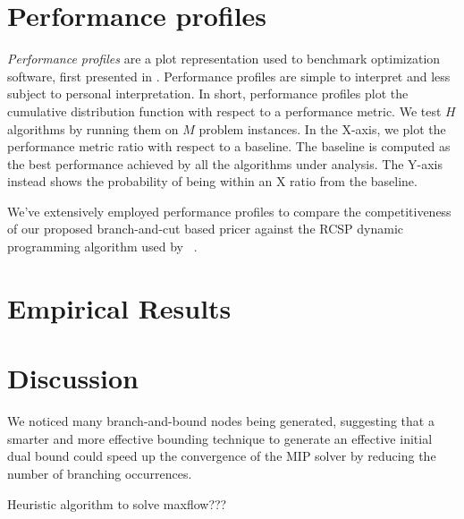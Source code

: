 \section{Performance profiles}
\label{sec:results-performance-profiles}

\textit{Performance profiles} are a plot representation used to benchmark optimization software,
first presented in \textcite{dolan2002}.
Performance profiles are simple to interpret and less subject to personal interpretation.
In short, performance profiles plot the cumulative distribution function with respect to a performance metric.
We test $H$ algorithms by running them on $M$ problem instances.
In the X-axis, we plot the performance metric ratio with respect to a baseline.
The baseline is computed as the best performance achieved by all the algorithms under analysis.
The Y-axis instead shows the probability of being within an X ratio from the baseline.

\medskip

We've extensively employed performance profiles to compare the competitiveness of
our proposed branch-and-cut based pricer
against the RCSP dynamic programming algorithm used by \bapcod\ \parencite{pessoa2020a}.

\begin{comment}
In this thesis, we will use performance profiles extensively to measure each solver by exploiting two performance metrics: \textbf{Time metric}, \textbf{Cost metric}.

A \textbf{Time performance profile} will tell us which resolution method is the fastest in terms of runtime.
A \textbf{Cost performance profile}, instead, will show us the cost ratio of the best upper bound obtained from each resolution method.
The ground truth optimal, as extracted from the dataset, is used instead as the cost baseline.
\end{comment}

\section{Empirical Results}
\label{sec:results-empirical-results}

\section{Discussion}
\label{sec:results-discussion}


We noticed many branch-and-bound nodes being generated,
suggesting that a smarter and more effective bounding technique to
generate an effective initial dual bound could speed up the convergence
of the MIP solver by reducing the number of branching occurrences.

Heuristic algorithm to solve maxflow???
